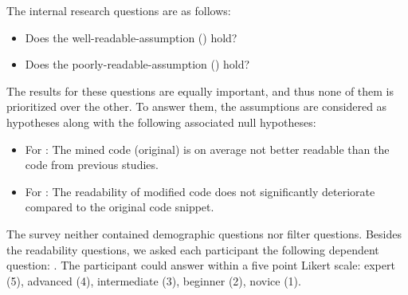 \documentclass[%
class=scrreprt,
chapterprefix=false,%
open=right,%
twoside=false,%
paper=a4,%
logofile={Logo\_zentral\_farbig\_EN.png},%
thesistype=master,%
UKenglish,%
]{se2thesis}
\theoremstyle{definition}
\begin{document}
	The internal research questions are as follows:
	\begin{itemize}
		\item Does the well-readable-assumption () hold?
		\item Does the poorly-readable-assumption () hold?
	\end{itemize}
	
	The results for these questions are equally important, and thus none of them is prioritized over the other.
	To answer them, the assumptions	are considered as hypotheses along with the following associated null hypotheses:
	\begin{itemize}
		\item For : The mined code (original) is on average not better readable than the code from previous studies.
		\item For : The readability of modified code does not significantly deteriorate compared to the original code snippet.
	\end{itemize}
	
	The survey neither contained demographic questions nor filter questions. Besides the readability questions, we asked each participant the following dependent question: . The participant could answer within a five point Likert scale: expert (5), advanced (4), intermediate (3), beginner (2), novice (1).
	
\end{document}
